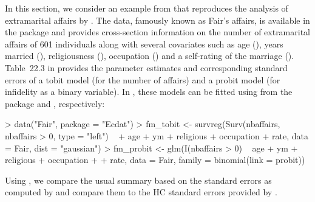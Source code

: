 \documentclass{Z}
\begin{document}
In this section, we consider an
example from \citet[Section~22.3.6]{hac:Greene:2003} that reproduces
the analysis of extramarital affairs by \citet{hac:Fair:1978}. The data,
famously known as Fair's affairs, is available in the  package
\citep{hac:Croissant:2005} and provides cross-section information on the number
of extramarital affairs of 601 individuals along with several covariates such
as age (), years married (), religiousness (),
occupation () and a self-rating of the marriage ().
Table~22.3 in \cite{hac:Greene:2003} provides the parameter estimates and corresponding
standard errors of a tobit model (for the number of affairs) and a probit model
(for infidelity as a binary variable). In , these models can be
fitted using  from the  package \citep{hac:Thernau+Lumley:2006}
and , respectively:

\begin{Schunk}
\begin{Sinput}
> data("Fair", package = "Ecdat")
> fm_tobit <- survreg(Surv(nbaffairs, nbaffairs > 0, type = "left") ~ 
+     age + ym + religious + occupation + rate, data = Fair, dist = "gaussian")
> fm_probit <- glm(I(nbaffairs > 0) ~ age + ym + religious + occupation + 
+     rate, data = Fair, family = binomial(link = probit))
\end{Sinput}
\end{Schunk}

Using , we compare the usual summary based on the standard
errors as computed by  \citep[which reproduces the results in][]{hac:Greene:2003}
and compare them to the HC standard errors provided by .
\end{document}
